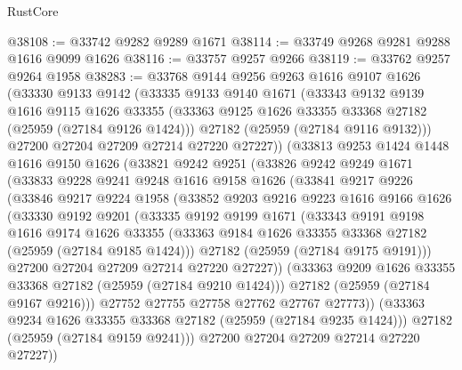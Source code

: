 \begin{lexlean}{RustCore}
\begin{coremodule}
@38108 := @33742 @9282 @9289 @1671
@38114 := @33749 @9268 @9281 @9288 @1616 @9099 @1626
@38116 := @33757 @9257 @9266
@38119 := @33762 @9257 @9264 @1958
@38283 := @33768
    @9144
    @9256
    @9263
    @1616
    @9107
    @1626
    (@33330
      @9133
      @9142
      (@33335
        @9133
        @9140
        @1671
        (@33343
          @9132
          @9139
          @1616
          @9115
          @1626
          @33355
          (@33363 @9125 @1626 @33355 @33368 @27182 (@25959 (@27184 @9126 @1424)))
          @27182
          (@25959 (@27184 @9116 @9132)))
        @27200
        @27204
        @27209
        @27214
        @27220
        @27227))
    (@33813
      @9253
      @1424
      @1448
      @1616
      @9150
      @1626
      (@33821
        @9242
        @9251
        (@33826
          @9242
          @9249
          @1671
          (@33833
            @9228
            @9241
            @9248
            @1616
            @9158
            @1626
            (@33841
              @9217
              @9226
              (@33846
                @9217
                @9224
                @1958
                (@33852
                  @9203
                  @9216
                  @9223
                  @1616
                  @9166
                  @1626
                  (@33330
                    @9192
                    @9201
                    (@33335
                      @9192
                      @9199
                      @1671
                      (@33343
                        @9191
                        @9198
                        @1616
                        @9174
                        @1626
                        @33355
                        (@33363 @9184 @1626 @33355 @33368 @27182 (@25959 (@27184 @9185 @1424)))
                        @27182
                        (@25959 (@27184 @9175 @9191)))
                      @27200
                      @27204
                      @27209
                      @27214
                      @27220
                      @27227))
                  (@33363 @9209 @1626 @33355 @33368 @27182 (@25959 (@27184 @9210 @1424)))
                  @27182
                  (@25959 (@27184 @9167 @9216)))
                @27752
                @27755
                @27758
                @27762
                @27767
                @27773))
            (@33363 @9234 @1626 @33355 @33368 @27182 (@25959 (@27184 @9235 @1424)))
            @27182
            (@25959 (@27184 @9159 @9241)))
          @27200
          @27204
          @27209
          @27214
          @27220
          @27227))

\end{coremodule}
\end{lexlean}
